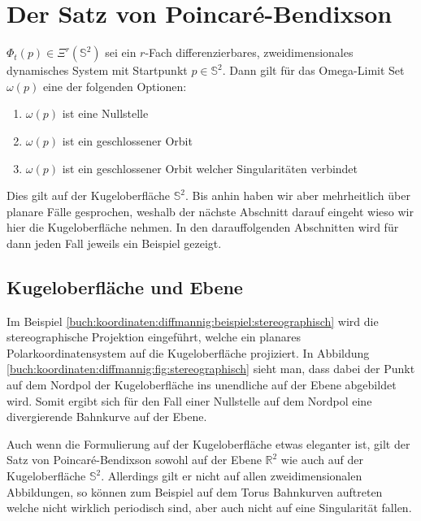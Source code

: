 \section{Der Satz von Poincaré-Bendixson} \label{poinbendix:section:poinbendix}

\begin{satz}
\label{poinbendix:satz:poinbendix}
$\Phi_t(p) \in \Xi^r(\mathbb{S}^2)$ sei ein $r$-Fach differenzierbares, zweidimensionales dynamisches System mit Startpunkt $p \in \mathbb{S}^2$.
Dann gilt für das Omega-Limit Set $\omega(p)$ eine der folgenden Optionen:
\begin{enumerate}
\item $\omega(p)$ ist eine Nullstelle
\item $\omega(p)$ ist ein geschlossener Orbit
\item $\omega(p)$ ist ein geschlossener Orbit welcher Singularitäten verbindet
\end{enumerate}
\end{satz}

Dies gilt auf der Kugeloberfläche $\mathbb{S}^2$.\cite{poinbendix:melo}
Bis anhin haben wir aber mehrheitlich über planare Fälle gesprochen, weshalb der nächste Abschnitt darauf eingeht wieso wir hier die Kugeloberfläche nehmen.
In den darauffolgenden Abschnitten wird für dann jeden Fall jeweils ein Beispiel gezeigt.

\subsection{Kugeloberfläche und Ebene} \label{poinbendix:subsection:kugeloberflaeche}

Im Beispiel \ref{buch:koordinaten:diffmannig:beispiel:stereographisch} wird die stereographische Projektion eingeführt, welche ein planares Polarkoordinatensystem auf die Kugeloberfläche projiziert.
In Abbildung \ref{buch:koordinaten:diffmannig:fig:stereographisch} sieht man, dass dabei der Punkt auf dem Nordpol der Kugeloberfläche ins unendliche auf der Ebene abgebildet wird.
Somit ergibt sich für den Fall einer Nullstelle auf dem Nordpol eine divergierende Bahnkurve auf der Ebene.

Auch wenn die Formulierung auf der Kugeloberfläche etwas eleganter ist, gilt der Satz von Poincaré-Bendixson sowohl auf der Ebene $\mathbb{R}^2$ wie auch auf der Kugeloberfläche $\mathbb{S}^2$.
Allerdings gilt er nicht auf allen zweidimensionalen Abbildungen, so können zum Beispiel auf dem Torus Bahnkurven auftreten welche nicht wirklich periodisch sind, aber auch nicht auf eine Singularität fallen.\cite{poinbendix:wiki}


